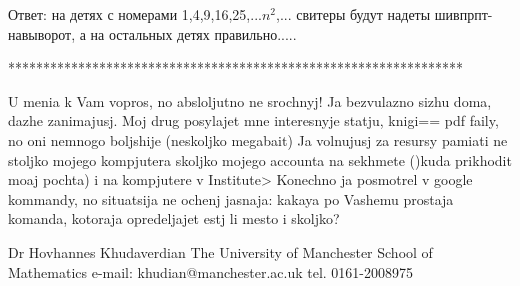 

  Ответ: на детях с номерами 1,4,9,16,25,...$n^2$,...
   свитеры будут надеты  шивпрпт-навыворот, а на остальных
    детях правильно.....

*****************************************************************



   U menia k Vam vopros, no absloljutno ne  srochnyj!
   Ja bezvulazno sizhu doma, dazhe zanimajusj.
Moj drug posylajet mne interesnyje statju, knigi==
pdf faily, no oni nemnogo boljshije (neskoljko megabait)
Ja volnujusj za resursy pamiati ne stoljko mojego kompjutera
skoljko mojego accounta na sekhmete ()kuda prikhodit moaj pochta)
i na kompjutere v Institute>
   Konechno ja posmotrel v google kommandy, no situatsija
   ne ochenj jasnaja: kakaya po Vashemu prostaja komanda,
kotoraja opredeljajet estj li mesto i skoljko?




                                     Dr Hovhannes Khudaverdian
                                    The University of Manchester
                                       School of Mathematics
                                   e-mail: khudian@manchester.ac.uk
                                        tel. 0161-2008975

